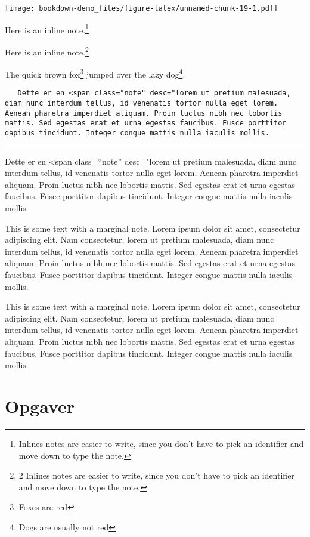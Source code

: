 \documentclass[]{book}
\let\rmarkdownfootnote\footnote%
\def\footnote{\protect\rmarkdownfootnote}
\theoremstyle{definition}
\theoremstyle{definition}
\theoremstyle{definition}
\theoremstyle{remark}
\begin{document}
\texttt{[image: bookdown-demo\_files/figure-latex/unnamed-chunk-19-1.pdf]}

Here is an inline note.\footnote{Inlines notes are easier to write,
  since you don't have to pick an identifier and move down to type the
  note.}

Here is an inline note.\footnote{2 Inlines notes are easier to write,
  since you don't have to pick an identifier and move down to type the
  note.}

The quick brown fox\footnote{Foxes are red} jumped over the lazy
dog\footnote{Dogs are usually not red}.

\begin{verbatim}
   Dette er en <span class="note" desc="lorem ut pretium malesuada, diam nunc interdum tellus, id venenatis tortor nulla eget lorem. Aenean pharetra imperdiet aliquam. Proin luctus nibh nec lobortis mattis. Sed egestas erat et urna egestas faucibus. Fusce porttitor dapibus tincidunt. Integer congue mattis nulla iaculis mollis.
\end{verbatim}

\begin{center}\rule{0.5\linewidth}{\linethickness}\end{center}

Dette er en \textless{}span class=``note'' desc="lorem ut pretium
malesuada, diam nunc interdum tellus, id venenatis tortor nulla eget
lorem. Aenean pharetra imperdiet aliquam. Proin luctus nibh nec lobortis
mattis. Sed egestas erat et urna egestas faucibus. Fusce porttitor
dapibus tincidunt. Integer congue mattis nulla iaculis mollis.

This is some text with a {marginal note}. Lorem ipsum dolor sit amet,
consectetur adipiscing elit. Nam consectetur, lorem ut pretium
malesuada, diam nunc interdum tellus, id venenatis tortor nulla eget
lorem. Aenean pharetra imperdiet aliquam. Proin luctus nibh nec lobortis
mattis. Sed egestas erat et urna egestas faucibus. Fusce porttitor
dapibus tincidunt. Integer congue mattis nulla iaculis mollis.

This is some text with a {marginal note}. Lorem ipsum dolor sit amet,
consectetur adipiscing elit. Nam consectetur, lorem ut pretium
malesuada, diam nunc interdum tellus, id venenatis tortor nulla eget
lorem. Aenean pharetra imperdiet aliquam. Proin luctus nibh nec lobortis
mattis. Sed egestas erat et urna egestas faucibus. Fusce porttitor
dapibus tincidunt. Integer congue mattis nulla iaculis mollis.

\hypertarget{opgaver}{%
\section{Opgaver}\label{opgaver}}
\end{document}
